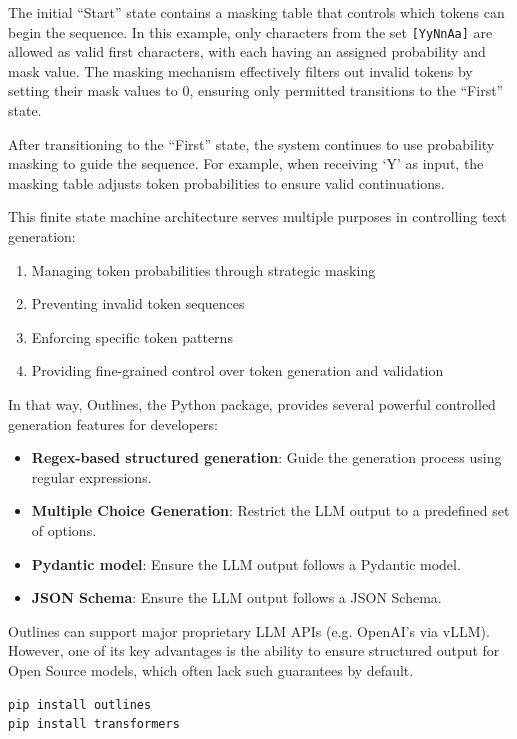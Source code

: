 The initial ``Start'' state contains a masking table that controls which tokens can begin the sequence. In this example, only characters from the set \texttt{[YyNnAa]} are allowed as valid first characters, with each having an assigned probability and mask value. The masking mechanism effectively filters out invalid tokens by setting their mask values to 0, ensuring only permitted transitions to the ``First'' state.

After transitioning to the ``First'' state, the system continues to use probability masking to guide the sequence. For example, when receiving `Y' as input, the masking table adjusts token probabilities to ensure valid continuations.

This finite state machine architecture serves multiple purposes in controlling text generation:

\begin{enumerate}
    \item Managing token probabilities through strategic masking
    \item Preventing invalid token sequences 
    \item Enforcing specific token patterns
    \item Providing fine-grained control over token generation and validation
\end{enumerate}

In that way, Outlines, the Python package, provides several powerful controlled generation features for developers:
\begin{itemize}
    \item \textbf{Regex-based structured generation}: Guide the generation process using regular expressions.
    \item \textbf{Multiple Choice Generation}: Restrict the LLM output to a predefined set of options.
    \item \textbf{Pydantic model}: Ensure the LLM output follows a Pydantic model.
    \item \textbf{JSON Schema}: Ensure the LLM output follows a JSON Schema.
\end{itemize}

Outlines can support major proprietary LLM APIs (e.g. OpenAI's via vLLM). However, one of its key advantages is the ability to ensure structured output for Open Source models, which often lack such guarantees by default.

\begin{verbatim}
pip install outlines
pip install transformers
\end{verbatim}


